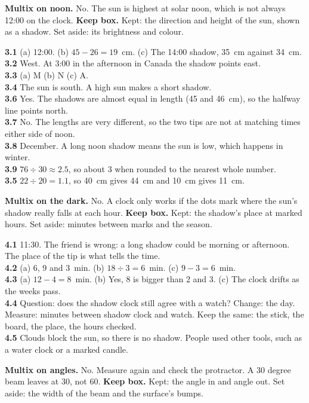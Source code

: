 \textbf{Multix on noon.} No. The sun is highest at solar noon, which is not always 12:00 on the clock. \textbf{Keep box.} Kept: the direction and height of the sun, shown as a shadow. Set aside: its brightness and colour.

\textbf{3.1} (a) 12:00. (b) $45-26=19$~cm. (c) The 14:00 shadow, 35~cm against 34~cm.\\
\textbf{3.2} West. At 3:00 in the afternoon in Canada the shadow points east.\\
\textbf{3.3} (a) M (b) N (c) A.\\
\textbf{3.4} The sun is south. A high sun makes a short shadow.\\
\textbf{3.6} Yes. The shadows are almost equal in length (45 and 46~cm), so the halfway line points north.\\
\textbf{3.7} No. The lengths are very different, so the two tips are not at matching times either side of noon.\\
\textbf{3.8} December. A long noon shadow means the sun is low, which happens in winter.\\
\textbf{3.9} $76\div30\approx2.5$, so about 3 when rounded to the nearest whole number.\\
\textbf{3.5} $22\div20=1.1$, so 40~cm gives 44~cm and 10~cm gives 11~cm.

\textbf{Multix on the dark.} No. A clock only works if the dots mark where the sun's shadow really falls at each hour. \textbf{Keep box.} Kept: the shadow's place at marked hours. Set aside: minutes between marks and the season.

\textbf{4.1} 11:30. The friend is wrong: a long shadow could be morning or afternoon. The place of the tip is what tells the time.\\
\textbf{4.2} (a) 6, 9 and 3~min. (b) $18\div3=6$~min. (c) $9-3=6$~min.\\
\textbf{4.3} (a) $12-4=8$~min. (b) Yes, 8 is bigger than 2 and 3. (c) The clock drifts as the weeks pass.\\
\textbf{4.4} Question: does the shadow clock still agree with a watch? Change: the day. Measure: minutes between shadow clock and watch. Keep the same: the stick, the board, the place, the hours checked.\\
\textbf{4.5} Clouds block the sun, so there is no shadow. People used other tools, such as a water clock or a marked candle.

\textbf{Multix on angles.} No. Measure again and check the protractor. A 30 degree beam leaves at 30, not 60. \textbf{Keep box.} Kept: the angle in and angle out. Set aside: the width of the beam and the surface's bumps.

